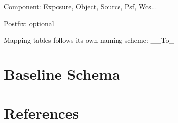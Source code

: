 \documentclass[DM,lsstdraft,toc]{lsstdoc}
\begin{document}
Component: Exposure, Object, Source, Psf, Wcs...

Postfix: optional

Mapping tables follows its own naming scheme: \_<table X name>\_To\_<table Y name>


\section{Baseline Schema}





\appendix
\section{References} \label{sec:bib}


%
\end{document}
